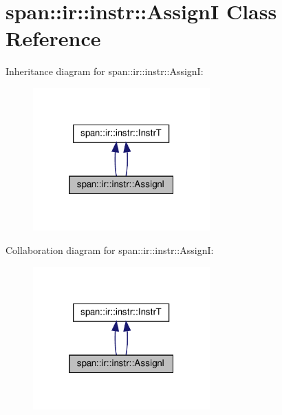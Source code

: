 \hypertarget{classspan_1_1ir_1_1instr_1_1AssignI}{}\section{span\+:\+:ir\+:\+:instr\+:\+:AssignI Class Reference}
\label{classspan_1_1ir_1_1instr_1_1AssignI}


Inheritance diagram for span\+:\+:ir\+:\+:instr\+:\+:AssignI\+:\nopagebreak
\begin{figure}[H]
\begin{center}
\leavevmode
\includegraphics[width=193pt]{classspan_1_1ir_1_1instr_1_1AssignI__inherit__graph}
\end{center}
\end{figure}


Collaboration diagram for span\+:\+:ir\+:\+:instr\+:\+:AssignI\+:\nopagebreak
\begin{figure}[H]
\begin{center}
\leavevmode
\includegraphics[width=193pt]{classspan_1_1ir_1_1instr_1_1AssignI__coll__graph}
\end{center}
\end{figure}
